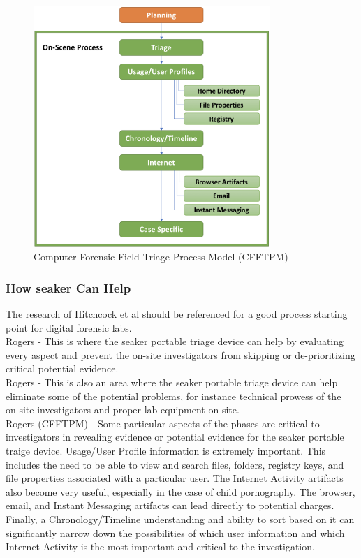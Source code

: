 \documentclass[12pt]{article}
\begin{document}
\begin{figure}[ht]
  \centering
    \includegraphics[width=0.8\textwidth]{images/CFFTPM.png}
  \caption{Computer Forensic Field Triage Process Model (CFFTPM)}
\end{figure}

\subsubsection{How \gls{seaker} Can Help}
The research of Hitchcock et al\cite{hitchcock2016tiered} should be referenced for a good process starting point for
digital forensic labs.\\

Rogers -  This is where the \gls{seaker} portable
triage device can help by evaluating every aspect and prevent the on-site investigators from skipping or
de-prioritizing critical potential evidence.\\

Rogers - This is also an area where the
\gls{seaker} portable triage device can help eliminate some of the potential problems, for instance technical prowess of the
on-site investigators and proper lab equipment on-site.\\

Rogers (CFFTPM) - Some particular aspects of the phases are critical to investigators in revealing evidence or potential evidence for
the \gls{seaker} portable traige device.  Usage/User Profile information is extremely important.  This includes the need to
be able to view and search files, folders, registry keys, and file properties associated with a particular user.  The
Internet Activity artifacts also become very useful, especially in the case of child pornography.  The browser, email,
and Instant Messaging artifacts can lead directly to potential charges.  Finally, a Chronology/Timeline understanding
and ability to sort based on it can significantly narrow down the possibilities of which user information and which
Internet Activity is the most important and critical to the investigation.\\
\end{document}
